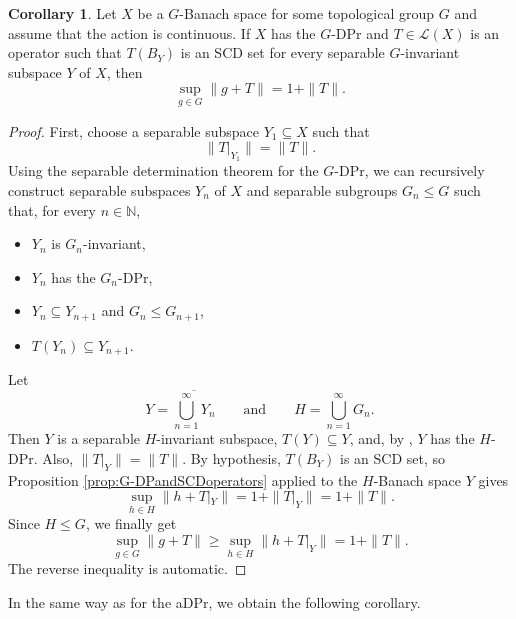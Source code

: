 \documentclass[a4paper,12pt]{amsart}
\theoremstyle{definition}
\newtheorem{corollary}[theorem]{Corollary}
\theoremstyle{definition}
\theoremstyle{remark}
\numberwithin{equation}{section}
\newcommand{\N}{\mathbb{N}}
\renewcommand{\geq}{\geqslant}
\renewcommand{\leq}{\leqslant}
\newcommand{\<}{\langle}
\renewcommand{\>}{\rangle}
\begin{document}
	\begin{corollary} \label{cor:GDP-SCD-nonseparable}
		Let $X$ be a $G$-Banach space for some topological group $G$ and assume that the action is continuous. If $X$ has the $G$-DPr and $T \in \mathcal{L}(X)$ is an operator such that $T(B_Y)$ is an SCD set for every separable $G$-invariant subspace $Y$ of $X$, then
		\begin{equation*}
			\sup_{g \in G} \|g + T\| = 1 + \|T\|.
		\end{equation*}
	\end{corollary}
	
	\begin{proof}
		First, choose a separable subspace $Y_1 \subseteq X$ such that
		\begin{equation*}
			\|T|_{Y_1}\| = \|T\|.
		\end{equation*}
		Using the separable determination theorem for the $G$-DPr, we can recursively construct separable subspaces $Y_n$ of $X$ and separable subgroups $G_n \leq G$ such that, for every $n \in \N$,
		\begin{itemize}
			\item $Y_n$ is $G_n$-invariant,
			\item $Y_n$ has the $G_n$-DPr,
			\item $Y_n \subseteq Y_{n+1}$ and $G_n \leq G_{n+1}$,
			\item $T(Y_n) \subseteq Y_{n+1}$.
		\end{itemize}
		Let
		\begin{equation*}
			Y = \overline{\bigcup_{n=1}^\infty Y_n}
			\qquad\text{and}\qquad
			H = \bigcup_{n=1}^\infty G_n.
		\end{equation*}
		Then $Y$ is a separable $H$-invariant subspace, $T(Y)\subseteq Y$, and, by , $Y$ has the $H$-DPr.
		Also, $\|T|_Y\| = \|T\|$. By hypothesis, $T(B_Y)$ is an SCD set, so Proposition \ref{prop:G-DPandSCDoperators} applied to the $H$-Banach space $Y$ gives
		\begin{equation*}
			\sup_{h \in H} \|h + T|_Y\| = 1 + \|T|_Y\| = 1 + \|T\|.
		\end{equation*}
		Since $H \leq G$, we finally get
		\begin{equation*}
			\sup_{g \in G} \|g + T\|
			\geq
			\sup_{h \in H} \|h + T|_Y\|
			=
			1+\|T\|.
		\end{equation*}
		The reverse inequality is automatic.
	\end{proof}
	
	In the same way as for the aDPr, we obtain the following corollary.
	
\end{document}
